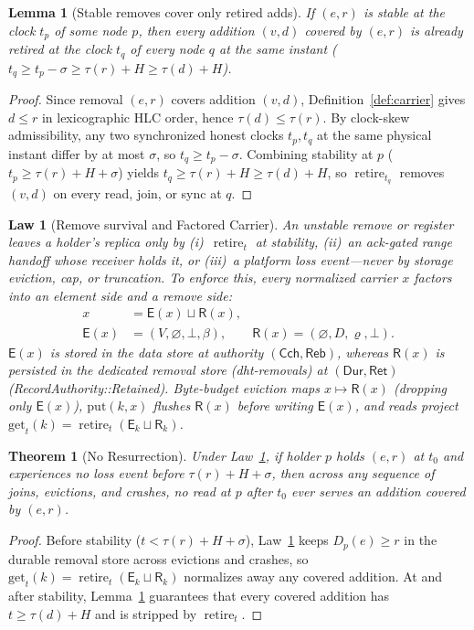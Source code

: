 \documentclass[journal]{IEEEtran}
\newtheorem{theorem}{Theorem}
\newtheorem{lemma}{Lemma}
\newtheorem{law}{Law}
\DeclareRobustCommand{\code}[1]{{\ttfamily\renewcommand{\_}{\textunderscore\allowbreak}#1}}
\begin{document}
\begin{lemma}[Stable removes cover only retired adds]\label{lem:stable-covers}
If $(e,r)$ is stable at the clock $t_p$ of some node $p$, then every addition
$(v,d)$ covered by $(e,r)$ is already retired at the clock $t_q$ of every node
$q$ at the same instant ($t_q\ge t_p-\sigma\ge\tau(r)+H\ge\tau(d)+H$).
\end{lemma}
\begin{proof}
Since removal $(e,r)$ covers addition $(v,d)$, Definition~\ref{def:carrier} gives $d\le r$ in lexicographic HLC order, hence $\tau(d)\le\tau(r)$. By clock-skew admissibility, any two synchronized honest clocks $t_p,t_q$ at the same physical instant differ by at most $\sigma$, so $t_q\ge t_p-\sigma$. Combining stability at $p$ ($t_p\ge\tau(r)+H+\sigma$) yields $t_q\ge\tau(r)+H\ge\tau(d)+H$, so $\operatorname{retire}_{t_q}$ removes $(v,d)$ on every read, join, or sync at $q$.
\end{proof}

\begin{law}[Remove survival and Factored Carrier]\label{law:factored-carrier}
An unstable remove or register leaves a holder's replica only by
(i)~$\operatorname{retire}_t$ at stability,
(ii)~an ack-gated range handoff whose receiver holds it, or
(iii)~a platform loss event---never by storage eviction, cap, or truncation.
To enforce this, every normalized carrier $x$ factors into an element side and
a remove side:
\[
\begin{aligned}
  x &= \mathsf{E}(x)\sqcup\mathsf{R}(x),\\
  \mathsf{E}(x) &= (V,\varnothing,\bot,\beta),\qquad
  \mathsf{R}(x) = (\varnothing,D,\varrho,\bot).
\end{aligned}
\]
$\mathsf{E}(x)$ is stored in the data store at authority $(\mathsf{Cch},\mathsf{Reb})$,
whereas $\mathsf{R}(x)$ is persisted in the dedicated \emph{removal store}
(\code{dht-removals}) at $(\mathsf{Dur},\mathsf{Ret})$ (\code{RecordAuthority::Retained}).
Byte-budget eviction maps $x\mapsto\mathsf{R}(x)$ (dropping only $\mathsf{E}(x)$),
$\mathrm{put}(k,x)$ flushes $\mathsf{R}(x)$ before writing $\mathsf{E}(x)$, and
reads project $\mathrm{get}_t(k)=\operatorname{retire}_t(\mathsf{E}_k\sqcup\mathsf{R}_k)$.
\end{law}

\begin{theorem}[No Resurrection]\label{theo:no-resurrection}
Under Law~\ref{law:factored-carrier}, if holder $p$ holds $(e,r)$ at $t_0$ and
experiences no loss event before $\tau(r)+H+\sigma$, then across any sequence of
joins, evictions, and crashes, no read at $p$ after $t_0$ ever serves an
addition covered by $(e,r)$.
\end{theorem}
\begin{proof}
Before stability ($t<\tau(r)+H+\sigma$), Law~\ref{law:factored-carrier} keeps
$D_p(e)\ge r$ in the durable removal store across evictions and crashes, so
$\mathrm{get}_t(k)=\operatorname{retire}_t(\mathsf{E}_k\sqcup\mathsf{R}_k)$ normalizes away any covered
addition.  At and after stability, Lemma~\ref{lem:stable-covers} guarantees that
every covered addition has $t\ge\tau(d)+H$ and is stripped by
$\operatorname{retire}_t$.
\end{proof}
\end{document}

